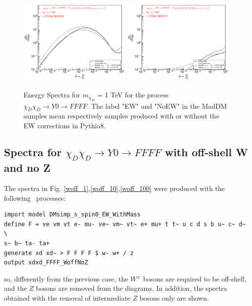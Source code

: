 \documentclass[epj,nopacs,fleqn]{svjour}
\begin{document}
\begin{figure}[!b]
\subfigure
{ \includegraphics[width=0.49\textwidth]{Fig/xdxd_Y0/1_neutrinos_mu_FFFF_xdxd_1.pdf}}
\subfigure
{ \includegraphics[width=0.49\textwidth]{Fig/xdxd_Y0/1_neutrinos_tau_FFFF_xdxd_1.pdf}}
\caption{Energy Spectra for $m_{\chi_D}$ = 1 TeV for the process $\chi_D \chi_D \rightarrow Y0 \rightarrow FFFF$. The label "EW" and "NoEW" in the MadDM samples mean respectively samples produced with or without the EW corrections in Pythia8.}
\end{figure}


\clearpage
\subsection{Spectra for $\chi_D \chi_D \rightarrow Y0 \rightarrow FFFF$ with off-shell W and no Z}
The spectra in Fig. \ref{woff_1},\ref{woff_10},\ref{woff_100} were produced with the following \MG~processes:
\begin{verbatim}
import model DMsimp_s_spin0_EW_WithMass
define F = ve vm vt e- mu- ve~ vm~ vt~ e+ mu+ t t~ u c d s b u~ c~ d~ \
s~ b~ ta- ta+
generate xd xd~ > F F F F $ w- w+ / z
output xdxd_FFFF_WoffNoZ
\end{verbatim}
so, differently from the previous case, the $W^{\pm }$ bosons are required to be off-shell, and the $Z$ bosons are removed from the diagrams. In addition, the spectra obtained with the removal of intermediate $Z$ bosons only are shown.
\clearpage
\end{document}

